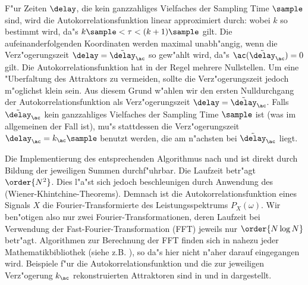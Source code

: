 F"ur Zeiten $\delay$, die kein ganzzahliges Vielfaches der Sampling Time $\sample$ sind,
wird die Autokorrelationsfunktion linear approximiert durch:
wobei $k$ so bestimmt wird, da"s $k\sample<\tau<(k+1)\sample$ gilt.  Die
aufeinanderfolgenden Koordinaten werden maximal unabh"angig, wenn die Verz"ogerungszeit
$\delay=\tilde\delay_\ac$ so gew"ahlt wird, da"s $\ac(\tilde\delay_\ac)=0$ gilt.  Die
Autokorrelationsfunktion hat in der Regel mehrere Nullstellen. Um eine "Uberfaltung des
Attraktors zu vermeiden, sollte die Verz"ogerungszeit jedoch m"oglichst klein sein.  Aus
diesem Grund w"ahlen wir den ersten Nulldurchgang der Autokorrelationsfunktion als
Verz"ogerungszeit $\delay=\tilde\delay_\ac$.  Falls $\tilde\delay_\ac$ kein ganzzahliges Vielfaches
der Sampling Time $\sample$ ist (was im allgemeinen  der Fall ist), mu"s stattdessen die Verz"ogerungszeit
$\delay_\ac=k_\ac\sample$ benutzt werden, die am n"achsten bei $\tilde\delay_\ac$ liegt.

Die Implementierung des entsprechenden Algorithmus nach  und
 ist direkt durch Bildung der jeweiligen Summen durchf"uhrbar. Die Laufzeit
betr"agt $\order{N^2}$. Dies l"a"st sich jedoch beschleunigen durch Anwendung des
\begriff(Wiener-Khintchine-Theorems). Demnach ist die Autokorrelationsfunktion eines
Signals $X$ die Fourier-Transformierte des Leistungsspektrums $P_X(\omega)$. Wir ben"otigen
also nur zwei Fourier-Transformationen, deren Laufzeit bei Verwendung der
Fast-Fourier-Transformation (FFT) jeweils nur $\order{N\log N}$ betr"agt.  Algorithmen zur
Berechnung 
der FFT finden sich in nahezu jeder Mathematikbibliothek (siehe z.B. \cite{Numerical-recipes}), so da"s
hier nicht n"aher darauf eingegangen wird. Beispiele f"ur die
Autokorrelationsfunktion und die zur jeweiligen Verz"ogerung $k_\ac$ rekonstruierten
Attraktoren sind in  und in   dargestellt.  


